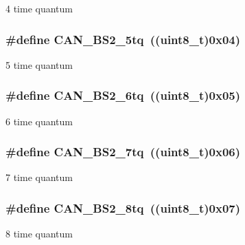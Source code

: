 \label{group__CAN__time__quantum__in__bit__segment__2_gaaff1c1cdd809f185299971c6437f32a0}
4 time quantum \hypertarget{group__CAN__time__quantum__in__bit__segment__2_ga89feba32bcc2e909f858d535edaad101}{
\subsubsection[{CAN\_\-BS2\_\-5tq}]{\setlength{\rightskip}{0pt plus 5cm}\#define CAN\_\-BS2\_\-5tq~((uint8\_\-t)0x04)}}
\label{group__CAN__time__quantum__in__bit__segment__2_ga89feba32bcc2e909f858d535edaad101}
5 time quantum \hypertarget{group__CAN__time__quantum__in__bit__segment__2_ga72c3245b794d3238763d1ec319bf386f}{
\subsubsection[{CAN\_\-BS2\_\-6tq}]{\setlength{\rightskip}{0pt plus 5cm}\#define CAN\_\-BS2\_\-6tq~((uint8\_\-t)0x05)}}
\label{group__CAN__time__quantum__in__bit__segment__2_ga72c3245b794d3238763d1ec319bf386f}
6 time quantum \hypertarget{group__CAN__time__quantum__in__bit__segment__2_ga8005adaef02fb90e400909de08dec031}{
\subsubsection[{CAN\_\-BS2\_\-7tq}]{\setlength{\rightskip}{0pt plus 5cm}\#define CAN\_\-BS2\_\-7tq~((uint8\_\-t)0x06)}}
\label{group__CAN__time__quantum__in__bit__segment__2_ga8005adaef02fb90e400909de08dec031}
7 time quantum \hypertarget{group__CAN__time__quantum__in__bit__segment__2_gaad8dcbb266cf5074bfb67bd7108597c6}{
\subsubsection[{CAN\_\-BS2\_\-8tq}]{\setlength{\rightskip}{0pt plus 5cm}\#define CAN\_\-BS2\_\-8tq~((uint8\_\-t)0x07)}}
\label{group__CAN__time__quantum__in__bit__segment__2_gaad8dcbb266cf5074bfb67bd7108597c6}
8 time quantum 
